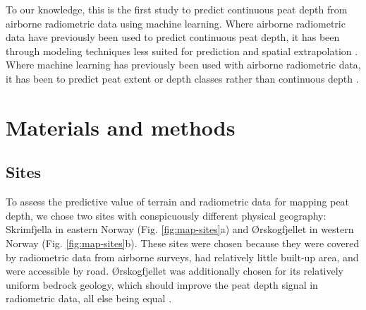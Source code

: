 \documentclass[soil, manuscript]{copernicus}
\begin{document}
To our knowledge, this is the first study to predict continuous peat depth from airborne radiometric data using machine learning.
Where airborne radiometric data have previously been used to predict continuous peat depth, it has been through modeling techniques less suited for prediction and spatial extrapolation \citep[e.g.,][]{keaneySpatialStatisticsEstimate2013, gatisMappingUplandPeat2019, siemonAirborneElectromagneticRadiometric2020}.
Where machine learning has previously been used with airborne radiometric data, it has been to predict peat extent or depth classes rather than continuous depth \citep[e.g.,][]{olearyDigitalSoilMapping2022, pohjankukkaDigitalMappingPeat2025}.

\section{Materials and methods}

\subsection{Sites}

To assess the predictive value of terrain and radiometric data for mapping peat depth, we chose two sites with conspicuously different physical geography: Skrimfjella in eastern Norway (Fig. \ref{fig:map-sites}a) and Ørskogfjellet in western Norway (Fig. \ref{fig:map-sites}b).
These sites were chosen because they were covered by radiometric data from airborne surveys, had relatively little built-up area, and were accessible by road.
Ørskogfjellet was additionally chosen for its relatively uniform bedrock geology, which should improve the peat depth signal in radiometric data, all else being equal \citep{minasnyDigitalMappingPeatlands2019}.
\end{document}
